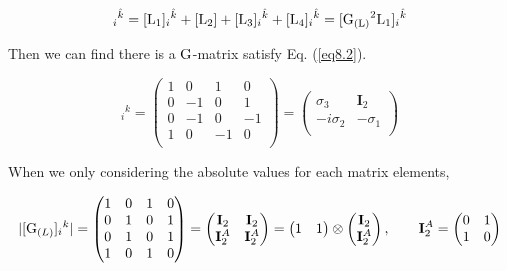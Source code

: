 \documentclass[12pt]{article}
\let\bm\relax
\newcommand{\bm}[1]{{\boldsymbol{#1}}}
\begin{document}
\begin{equation}
[{\bm{\rm L}}]_{i}{}^{\hat k}=[{\bm{\rm L}}_1]_{i}{}^{\hat k}+[{\bm{\rm L}}_2]+[{\bm{\rm L}}_3]_{i}{}^{\hat k}
+[{\bm{\rm L}}_4]_{i}{}^{\hat k}
=[{\bm{\rm G_{(L)}}}^2{\bm{\rm L}}_1]_{i}{}^{\hat k}
\label{eq8.2}
\end{equation}

Then we can find there is a ${\bm{\rm G}}$-matrix satisfy Eq. (\ref{eq8.2}).

\begin{equation}
[\bm{\rm G}_{(L)}]_{i}{}^{k}=
\begin{pmatrix}
1 & 0 & 1 & 0 \\
0 & -1 & 0 & 1 \\
0 & -1 & 0 & -1 \\
1 & 0 & -1 & 0 \\
\end{pmatrix}=
\begin{pmatrix}
\sigma_3 & \mathbf{I}_2 \\
-i\sigma_2 & -\sigma_1 \\
\end{pmatrix}
\end{equation}

When we only considering the absolute values for each matrix elements,

\begin{equation}
|[\bm{\rm G}_{(L)}]_i{}^{k}|=
\begin{pmatrix}
1 & 0 & 1 & 0 \\
0 & 1 & 0 & 1 \\
0 & 1 & 0 & 1 \\
1 & 0 & 1 & 0 \\
\end{pmatrix}=
\begin{pmatrix}
\mathbf{I}_2 & \mathbf{I}_2 \\
\mathbf{I}^A_2 & \mathbf{I}^A_2 \\
\end{pmatrix}
=\begin{pmatrix}
1 & 1 \\
\end{pmatrix}
\otimes
\begin{pmatrix}
\mathbf{I}_2 \\
\mathbf{I}^A_2 \\
\end{pmatrix},\quad\quad \mathbf{I}^A_2=
\begin{pmatrix}
0 & 1 \\
1 & 0 \\
\end{pmatrix}
\end{equation}
\end{document}
